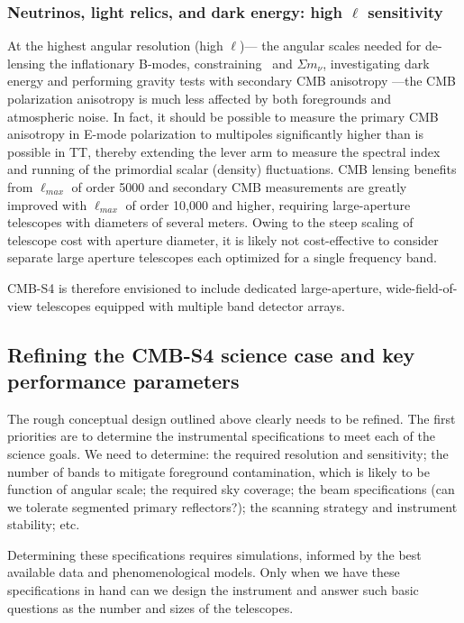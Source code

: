 \subsubsection{Neutrinos, light relics, and dark energy: high $\ell$ sensitivity}

At the highest angular resolution (high $\ell$)--- the angular scales needed for de-lensing the inflationary B-modes, constraining \neff\ and $\Sigma m_\nu$,  investigating dark energy and performing gravity tests with secondary CMB  anisotropy ---the CMB polarization anisotropy is much less affected by both foregrounds and atmospheric noise. In fact, it should be possible to measure the primary CMB anisotropy in E-mode polarization to multipoles significantly higher than is possible in TT, thereby extending the lever arm to measure the spectral index and running of the primordial scalar (density) fluctuations. CMB lensing benefits from $\ell_{max}$ of order 5000 and secondary CMB measurements are greatly improved with $\ell_{max}$ of order 10,000 and higher, requiring large-aperture telescopes with diameters of several meters. Owing to the steep scaling of telescope cost with aperture diameter, it is likely not cost-effective to consider separate large aperture telescopes each optimized for a single frequency band. 

CMB-S4 is therefore envisioned to include dedicated large-aperture, wide-field-of-view telescopes equipped with multiple band detector arrays.

\subsection{Refining the CMB-S4 science case and key performance parameters}

The rough conceptual design outlined above clearly needs to be refined.  The first priorities are to determine the instrumental specifications to meet each of the science goals. We need to determine:  the required resolution and sensitivity; the number of bands to mitigate foreground contamination, which is likely to be function of angular scale; the required sky coverage; the beam specifications (can we tolerate segmented primary reflectors?); the scanning strategy and instrument stability; etc.

Determining these specifications requires simulations, informed by the best available data and phenomenological models.  Only when we have these specifications in hand can we design the instrument and answer such basic questions as the number and sizes of the telescopes. 

